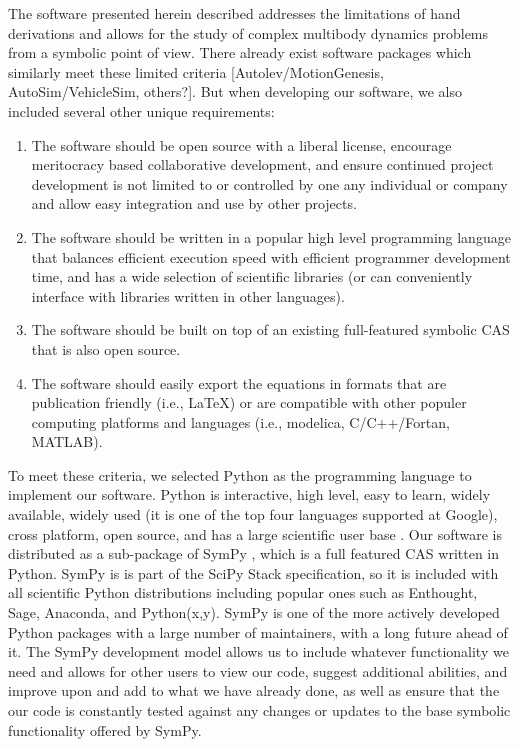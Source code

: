 \documentclass[twocolumn,10pt]{asme2e}
\begin{document}
The software presented herein described addresses the limitations of hand
derivations and allows for the study of complex multibody dynamics problems
from a symbolic point of view. There already exist software packages which
similarly meet these limited criteria [Autolev/MotionGenesis,
AutoSim/VehicleSim, others?]. But when developing our software, we also
included several other unique requirements:
\begin{enumerate}
  \item The software should be open source with a liberal license, encourage
  meritocracy based collaborative development, and ensure continued project
  development is not limited to or controlled by one any individual or company
  and allow easy integration and use by other projects.

  \item The software should be written in a popular high level programming
  language that balances efficient execution speed with efficient programmer
  development time, and has a wide selection of scientific libraries (or can
  conveniently interface with libraries written in other languages).

  \item The software should be built on top of an existing full-featured
  symbolic CAS that is also open source.

  \item The software should easily export the equations in formats that are
  publication friendly (i.e., \LaTeX) or are compatible with other populer
  computing platforms and languages (i.e., modelica, C/C++/Fortan, MATLAB).
\end{enumerate}
To meet these criteria, we selected Python as the programming language to
implement our software.  Python is interactive, high level, easy to learn,
widely available, widely used (it is one of the top four languages supported at
Google), cross platform, open source, and has a large scientific user base .
Our software is distributed as a sub-package of SymPy \cite{sympy2012}, which
is a full featured CAS written in
Python.  SymPy is is part of the SciPy Stack \cite{scipystack} specification,
so it is included with all scientific Python distributions including popular
ones such as Enthought, Sage, Anaconda, and Python(x,y). SymPy is one of the
more actively developed Python packages with a large number of maintainers,
with a long future ahead of it. The SymPy development model allows us to
include whatever functionality we need and allows for other users to view our
code, suggest additional abilities, and improve upon and add to what we have
already done, as well as ensure that the our code is constantly tested against
any changes or updates to the base symbolic functionality offered by SymPy.
\end{document}

